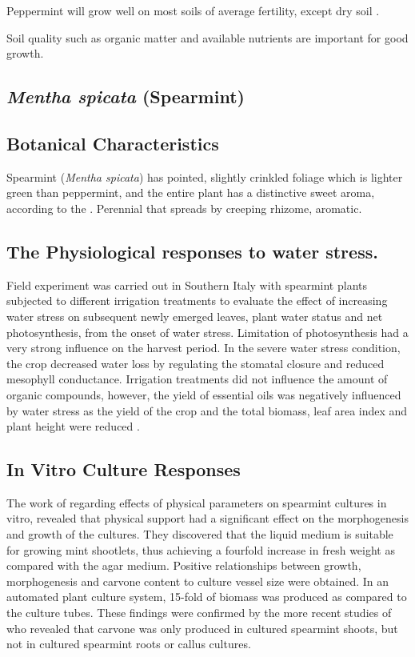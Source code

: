 Peppermint will grow well on most soils of average fertility, except dry soil \parencite{umd2026growing}.

Soil quality such as organic matter and available nutrients are important for good growth.

\subsection{\textit{Mentha spicata} (Spearmint)}

\subsection*{Botanical Characteristics}

Spearmint (\textit{Mentha spicata}) has pointed, slightly crinkled foliage which is lighter green than peppermint, and the entire plant has a distinctive sweet aroma, according to the \textcite{rhs2026spicata}. Perennial that spreads by creeping rhizome, aromatic.

\subsection*{The Physiological responses to water stress.}

Field experiment was carried out in Southern Italy with spearmint plants subjected to different irrigation treatments to evaluate the effect of increasing water stress on subsequent newly emerged leaves, plant water status and net photosynthesis, from the onset of water stress. Limitation of photosynthesis had a very strong influence on the harvest period. In the severe water stress condition, the crop decreased water loss by regulating the stomatal closure and reduced mesophyll conductance. Irrigation treatments did not influence the amount of organic compounds, however, the yield of essential oils was negatively influenced by water stress as the yield of the crop and the total biomass, leaf area index and plant height were reduced \parencite{marino2019evaluation}.

\subsection*{In Vitro Culture Responses}

The work of \textcite{tisserat2004influence} regarding effects of physical parameters on spearmint cultures in vitro, revealed that physical support had a significant effect on the morphogenesis and growth of the cultures. They discovered that the liquid medium is suitable for growing mint shootlets, thus achieving a fourfold increase in fresh weight as compared with the agar medium. Positive relationships between growth, morphogenesis and carvone content to culture vessel size were obtained. In an automated plant culture system, 15-fold of biomass was produced as compared to the culture tubes. These findings were confirmed by the more recent studies of \textcite{tisserat2008growth} who revealed that carvone was only produced in cultured spearmint shoots, but not in cultured spearmint roots or callus cultures.

